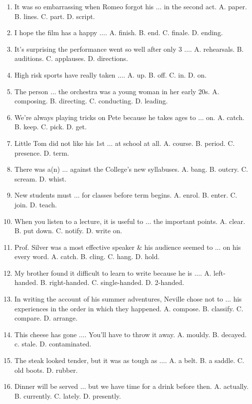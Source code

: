 \documentclass{article}
\numberwithin{equation}{section}
\begin{document}
\begin{enumerate}[leftmargin=2mm]
	\item It was so embarrassing when Romeo forgot his $\ldots$ in the second act. A. paper. B. lines. C. part. D. script.
	\item I hope the film has a happy $\ldots$. A. finish. B. end. C. finale. D. ending.
	\item It's surprising the performance went so well after only 3 $\ldots$. A. rehearsals. B. auditions. C. applauses. D. directions.
	\item High risk sports have really taken $\ldots$. A. up. B. off. C. in. D. on.
	\item The person $\ldots$ the orchestra was a young woman in her early 20s. A. composing. B. directing. C. conducting. D. leading.
	\item We're always playing tricks on Pete because he takes ages to $\ldots$ on. A. catch. B. keep. C. pick. D. get.
	\item Little Tom did not like his 1st $\ldots$ at school at all. A. course. B. period. C. presence. D. term.
	\item There was a(n) $\ldots$ against the College's new syllabuses. A. bang. B. outcry. C. scream. D. whist.
	\item New students must $\ldots$ for classes before term begins. A. enrol. B. enter. C. join. D. teach.
	\item When you listen to a lecture, it is useful to $\ldots$ the important points. A. clear. B. put down. C. notify. D. write on.
	\item Prof. Silver was a most effective speaker \& his audience seemed to $\ldots$ on his every word. A. catch. B. cling. C. hang. D. hold.
	\item My brother found it difficult to learn to write because he is $\ldots$. A. left-handed. B. right-handed. C. single-handed. D. 2-handed.
	\item In writing the account of his summer adventures, Neville chose not to $\ldots$ his experiences in the order in which they happened. A. compose. B. classify. C. compare. D. arrange.
	\item This cheese has gone $\ldots$. You'll have to throw it away. A. mouldy. B. decayed. c. stale. D. contaminated.
	\item The steak looked tender, but it was as tough as $\ldots$. A. a belt. B. a saddle. C. old boots. D. rubber.
	\item Dinner will be served $\ldots$ but we have time for a drink before then. A. actually. B. currently. C. lately. D. presently.

\end{enumerate}
\end{document}
